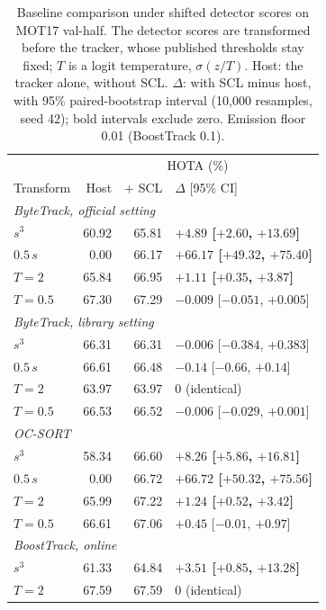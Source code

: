 \begin{table}[tbp]
\centering
\caption{Baseline comparison under shifted detector scores on MOT17 val-half. The detector scores are transformed before the tracker, whose published thresholds stay fixed; $T$ is a logit temperature, $\sigma(z/T)$. Host: the tracker alone, without SCL. $\Delta$: with SCL minus host, with 95\% paired-bootstrap interval (10,000 resamples, seed 42); bold intervals exclude zero. Emission floor 0.01 (BoostTrack 0.1).}
\label{tab:res-scl-shift}
\begin{tabular}{lrrl}
\toprule
 & \multicolumn{3}{c}{HOTA (\%)}\\
Transform & Host & + SCL & $\Delta$ [95\% CI]\\
\midrule
\multicolumn{4}{l}{\textit{ByteTrack, official setting} \cite{zhang2022bytetrack}}\\
\quad $s^3$ & 60.92 & 65.81 & \textbf{$+4.89$ [$+2.60$, $+13.69$]}\\
\quad $0.5\,s$ & 0.00 & 66.17 & \textbf{$+66.17$ [$+49.32$, $+75.40$]}\\
\quad $T=2$ & 65.84 & 66.95 & \textbf{$+1.11$ [$+0.35$, $+3.87$]}\\
\quad $T=0.5$ & 67.30 & 67.29 & $-0.009$ [$-0.051$, $+0.005$]\\
\multicolumn{4}{l}{\textit{ByteTrack, library setting} \cite{zhang2022bytetrack}}\\
\quad $s^3$ & 66.31 & 66.31 & $-0.006$ [$-0.384$, $+0.383$]\\
\quad $0.5\,s$ & 66.61 & 66.48 & $-0.14$ [$-0.66$, $+0.14$]\\
\quad $T=2$ & 63.97 & 63.97 & 0 (identical)\\
\quad $T=0.5$ & 66.53 & 66.52 & $-0.006$ [$-0.029$, $+0.001$]\\
\multicolumn{4}{l}{\textit{OC-SORT} \cite{cao2023ocsort}}\\
\quad $s^3$ & 58.34 & 66.60 & \textbf{$+8.26$ [$+5.86$, $+16.81$]}\\
\quad $0.5\,s$ & 0.00 & 66.72 & \textbf{$+66.72$ [$+50.32$, $+75.56$]}\\
\quad $T=2$ & 65.99 & 67.22 & \textbf{$+1.24$ [$+0.52$, $+3.42$]}\\
\quad $T=0.5$ & 66.61 & 67.06 & $+0.45$ [$-0.01$, $+0.97$]\\
\multicolumn{4}{l}{\textit{BoostTrack, online} \cite{stanojevic2024boosttrack}}\\
\quad $s^3$ & 61.33 & 64.84 & \textbf{$+3.51$ [$+0.85$, $+13.28$]}\\
\quad $T=2$ & 67.59 & 67.59 & 0 (identical)\\
\bottomrule
\end{tabular}
\end{table}

